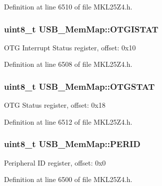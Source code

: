 Definition at line 6510 of file M\+K\+L25\+Z4.\+h.

\subsubsection[{\texorpdfstring{O\+T\+G\+I\+S\+T\+AT}{OTGISTAT}}]{\setlength{\rightskip}{0pt plus 5cm}uint8\+\_\+t U\+S\+B\+\_\+\+Mem\+Map\+::\+O\+T\+G\+I\+S\+T\+AT}\hypertarget{struct_u_s_b___mem_map_a6eacb73f23f815f7686f4e7bf7eb2fcc}{}\label{struct_u_s_b___mem_map_a6eacb73f23f815f7686f4e7bf7eb2fcc}
O\+TG Interrupt Status register, offset\+: 0x10 

Definition at line 6508 of file M\+K\+L25\+Z4.\+h.

\subsubsection[{\texorpdfstring{O\+T\+G\+S\+T\+AT}{OTGSTAT}}]{\setlength{\rightskip}{0pt plus 5cm}uint8\+\_\+t U\+S\+B\+\_\+\+Mem\+Map\+::\+O\+T\+G\+S\+T\+AT}\hypertarget{struct_u_s_b___mem_map_a0398fe890efd8110f3d182e7fcb8a0c5}{}\label{struct_u_s_b___mem_map_a0398fe890efd8110f3d182e7fcb8a0c5}
O\+TG Status register, offset\+: 0x18 

Definition at line 6512 of file M\+K\+L25\+Z4.\+h.

\subsubsection[{\texorpdfstring{P\+E\+R\+ID}{PERID}}]{\setlength{\rightskip}{0pt plus 5cm}uint8\+\_\+t U\+S\+B\+\_\+\+Mem\+Map\+::\+P\+E\+R\+ID}\hypertarget{struct_u_s_b___mem_map_aa3644755d5a3d7b9a8c01055452ebe39}{}\label{struct_u_s_b___mem_map_aa3644755d5a3d7b9a8c01055452ebe39}
Peripheral ID register, offset\+: 0x0 

Definition at line 6500 of file M\+K\+L25\+Z4.\+h.

